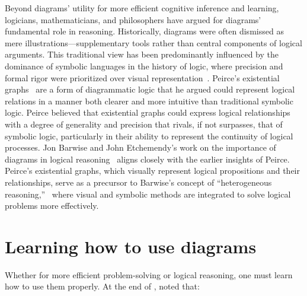 Beyond diagrams' utility for more efficient cognitive inference and learning, logicians, mathematicians, and philosophers have argued for diagrams' fundamental role in reasoning. Historically, diagrams were often dismissed as mere illustrations---supplementary tools rather than central components of logical arguments. This traditional view has been predominantly influenced by the dominance of symbolic languages in the history of logic, where precision and formal rigor were prioritized over visual representation~\cite{shin_diagrams_2018}. Peirce's existential graphs~\cite{peirce_collected_1931} are a form of diagrammatic logic that he argued could represent logical relations in a manner both clearer and more intuitive than traditional symbolic logic. Peirce believed that existential graphs could express logical relationships with a degree of generality and precision that rivals, if not surpasses, that of symbolic logic, particularly in their ability to represent the continuity of logical processes. Jon Barwise and John Etchemendy's work on the importance of diagrams in logical reasoning~\cite{barwise_visual_2019} aligns closely with the earlier insights of Peirce. Peirce's existential graphs, which visually represent logical propositions and their relationships, serve as a precursor to Barwise's concept of ``heterogeneous reasoning,''~\cite{barwise_heterogeneous_1993} where visual and symbolic methods are integrated to solve logical problems more effectively. 





\section{Learning how to use diagrams}


Whether for more efficient problem-solving or logical reasoning, one must learn how to use them properly. At the end of , \citet{whyDiagramWorth} noted that:

